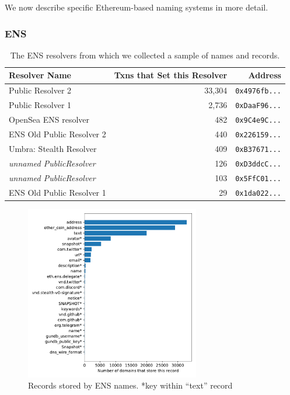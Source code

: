 \documentclass[conference]{IEEEtran}
\begin{document}
We now describe specific Ethereum-based naming systems in more detail.

\subsubsection{ENS}

\begin{table}
	\begin{tabular}{lrr}
		\toprule
		Resolver Name & Txns that Set this Resolver & Address \\
		\midrule 
		Public Resolver 2 & 33,304 & \texttt{0x4976fb...} \\
		Public Resolver 1 & 2,736 & \texttt{0xDaaF96...} \\
		OpenSea ENS resolver & 482 & \texttt{0x9C4e9C...} \\
		ENS Old Public Resolver 2 & 440	& \texttt{0x226159...} \\
		Umbra: Stealth Resolver & 409 & \texttt{0xB37671...} \\
		\textit{unnamed PublicResolver} & 126 & \texttt{0xD3ddcC...} \\
		\textit{unnamed PublicResolver} & 103 & \texttt{0x5FfC01...} \\
		ENS Old Public Resolver 1 & 29 & \texttt{0x1da022...} \\
		\bottomrule
	\end{tabular}
\label{tab:ens_resolvers}
\caption{The ENS resolvers from which we collected a sample of names and 
records.}
\end{table}

\begin{figure}[t]
	\centering
	\includegraphics[width=3in]{figs/ens_names.pdf}
	\caption{Records stored by ENS names. *key within ``text'' record}
	\label{fig:ens_records}
\end{figure}
\end{document}
